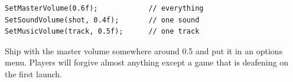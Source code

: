 \begin{lstlisting}
SetMasterVolume(0.6f);            // everything
SetSoundVolume(shot, 0.4f);       // one sound
SetMusicVolume(track, 0.5f);      // one track
\end{lstlisting}

Ship with the master volume somewhere around 0.5 and put it in an options menu.
Players will forgive almost anything except a game that is deafening on the first
launch.

